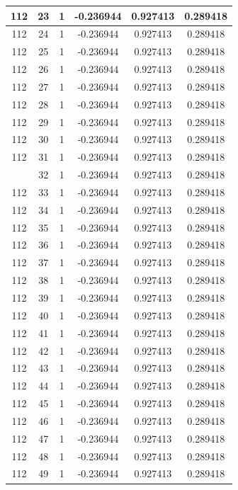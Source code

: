 \documentclass[12pt,a4paper]{article}
\numberwithin{equation}{section}
\numberwithin{figure}{section}
\numberwithin{table}{section}
\begin{document}
\begin{longtable}{|c|c|c|c|c|c|}
112 & 23 & 1 & -0.236944 & 0.927413 & 0.289418 \\ \hline
112 & 24 & 1 & -0.236944 & 0.927413 & 0.289418 \\ \hline
112 & 25 & 1 & -0.236944 & 0.927413 & 0.289418 \\ \hline
112 & 26 & 1 & -0.236944 & 0.927413 & 0.289418 \\ \hline
112 & 27 & 1 & -0.236944 & 0.927413 & 0.289418 \\ \hline
112 & 28 & 1 & -0.236944 & 0.927413 & 0.289418 \\ \hline
112 & 29 & 1 & -0.236944 & 0.927413 & 0.289418 \\ \hline
112 & 30 & 1 & -0.236944 & 0.927413 & 0.289418 \\ \hline
112 & 31 & 1 & -0.236944 & 0.927413 & 0.289418 \\ \hline
\pagebreak
112 & 32 & 1 & -0.236944 & 0.927413 & 0.289418 \\ \hline
112 & 33 & 1 & -0.236944 & 0.927413 & 0.289418 \\ \hline
112 & 34 & 1 & -0.236944 & 0.927413 & 0.289418 \\ \hline
112 & 35 & 1 & -0.236944 & 0.927413 & 0.289418 \\ \hline
112 & 36 & 1 & -0.236944 & 0.927413 & 0.289418 \\ \hline
112 & 37 & 1 & -0.236944 & 0.927413 & 0.289418 \\ \hline
112 & 38 & 1 & -0.236944 & 0.927413 & 0.289418 \\ \hline
112 & 39 & 1 & -0.236944 & 0.927413 & 0.289418 \\ \hline
112 & 40 & 1 & -0.236944 & 0.927413 & 0.289418 \\ \hline
112 & 41 & 1 & -0.236944 & 0.927413 & 0.289418 \\ \hline
112 & 42 & 1 & -0.236944 & 0.927413 & 0.289418 \\ \hline
112 & 43 & 1 & -0.236944 & 0.927413 & 0.289418 \\ \hline
112 & 44 & 1 & -0.236944 & 0.927413 & 0.289418 \\ \hline
112 & 45 & 1 & -0.236944 & 0.927413 & 0.289418 \\ \hline
112 & 46 & 1 & -0.236944 & 0.927413 & 0.289418 \\ \hline
112 & 47 & 1 & -0.236944 & 0.927413 & 0.289418 \\ \hline
112 & 48 & 1 & -0.236944 & 0.927413 & 0.289418 \\ \hline
112 & 49 & 1 & -0.236944 & 0.927413 & 0.289418 \\ \hline

\end{longtable}
\end{document}
